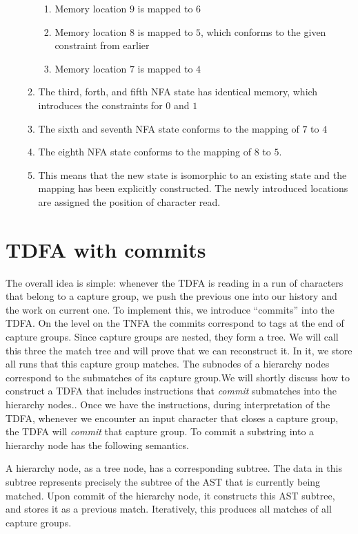 \documentclass[english]{sigplanconf}
\begin{document}
\begin{enumerate}
\begin{enumerate}
\begin{enumerate}
\item Memory location $9$ is mapped to $6$
\item Memory location $8$ is mapped to $5$, which conforms to the given
constraint from earlier
\item Memory location $7$ is mapped to $4$
\end{enumerate}
\item The third, forth, and fifth NFA state has identical memory, which
introduces the constraints for $0$ and $1$
\item The sixth and seventh NFA state conforms to the mapping of $7$ to
$4$
\item The eighth NFA state conforms to the mapping of $8$ to $5$.
\item This means that the new state is isomorphic to an existing state and
the mapping has been explicitly constructed. The newly introduced
locations are assigned the position of character read.
\end{enumerate}
\end{enumerate}

\section{TDFA with commits\label{sec:TNFA-with-hierarchical}}

The overall idea is simple: whenever the TDFA is reading in a run
of characters that belong to a capture group, we push the previous
one into our history and the work on current one. To implement this,
we introduce ``commits'' into the TDFA. On the level on the TNFA
the commits correspond to tags at the end of capture groups. Since
capture groups are nested, they form a tree. We will call this three
the match tree and will prove that we can reconstruct it. In it, we
store all runs that this capture group matches. The subnodes of a
hierarchy nodes correspond to the submatches of its capture group.We
will shortly discuss how to construct a TDFA that includes instructions
that \emph{commit} submatches into the hierarchy nodes.. Once we have
the instructions, during interpretation of the TDFA, whenever we encounter
an input character that closes a capture group, the TDFA will \emph{commit}
that capture group. To commit a substring into a hierarchy node has
the following semantics.

A hierarchy node, as a tree node, has a corresponding subtree. The
data in this subtree represents precisely the subtree of the AST that
is currently being matched. Upon commit of the hierarchy node, it
constructs this AST subtree, and stores it as a previous match. Iteratively,
this produces all matches of all capture groups.
\end{document}

